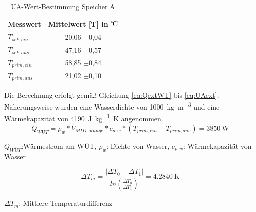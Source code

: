 \begin{table}[H]
	\centering
	
	\begin{tabular}{l|c}
		
		
		\textbf{Messwert} & \textbf{Mittelwert} [T] in ${\celsius}$\\
		\hline
	$T_{sek,ein}$ & 20,06 $\pm$0,04\\
	$T_{sek,aus}$ & 47,16 $\pm$0,57\\
	$T_{prim,ein}$ & 58,85 $\pm$0,84\\
	$T_{prim,aus}$ & 21,02 $\pm$0,10\\

	\end{tabular}
\caption[UA-Wert-Bestimmung Speicher A]{UA-Wert-Bestimmung Speicher A}
\label{tab:extWT}
\end{table}
Die Berechnung erfolgt gemäß Gleichung \ref{eq:QextWT} bis \ref{eq:UAext}. Näherungsweise wurden eine Wasserdichte von \SI{1000}{\kilogram\per\cubic\meter} und eine Wärmekapazität von \SI{4190}{\joule\per\kilogram\kelvin} angenommen.
\begin{equation}
	\label{eq:QextWT}
	\dot Q_{WÜT} = \rho_{w} * \dot V_{MID,orange} * c_{p,w} * (T_{prim,ein}-T_{prim,aus}) = \SI{3850}{\watt}
\end{equation}

\begin{center}
	\begin{small}
	$\dot Q_{WÜT}$:Wärmestrom am WÜT,	
	$\rho_{w}$:	Dichte von Wasser,
	$c_{p,w}$: Wärmekapazität von Wasser
	\end{small}
\end{center}

\begin{equation}
	\label{eq:DeltaTm}
	\Delta T_{m} = \frac{|\Delta T_{0} - \Delta T_{1}|}{ln(\frac{\Delta T_{0}}{\Delta T_{1}})} = \SI{4,2840}{\kelvin}
\end{equation}
\begin{center}
	\begin{small}
		$\Delta T_{m}$: Mittlere Temperaturdifferenz
	\end{small}
\end{center}

